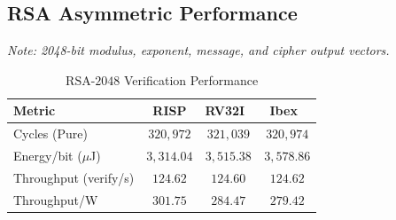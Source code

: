 \subsection{RSA Asymmetric Performance}

\begin{table}[!t]
\centering
\caption{Functional Verification Vectors for $\text{RSA}\text{-}2048$ Engine}
\label{tab:rsa_functional_full}
\small
{}
\vspace{2pt}
\raggedright
\footnotesize\textit{Note: 2048-bit modulus, exponent, message, and cipher output vectors.}
\end{table}

\begin{table}[!t]
\centering
\caption{$\text{RSA}\text{-}2048$ Verification Performance}
\label{tab:rsa_perf}
\small
\begin{tabular}{l  c c c}
\toprule
\textbf{Metric} & \textbf{RISP} & \textbf{RV32I~\cite{harris2021digital}} & \textbf{Ibex~\cite{gallmann2021swift}} \\
\midrule
Cycles (Pure) & $320,972$ & $321,039$ & $320,974$ \\
Energy/bit ($\mu$J) & $3,314.04$ & $3,515.38$ & $3,578.86$ \\
Throughput (verify/s) & $124.62$ & $124.60$ & $124.62$ \\
Throughput/W & $301.75$ & $284.47$ & $279.42$ \\
\bottomrule
\end{tabular}
\end{table}


